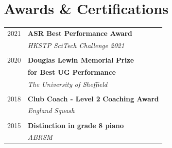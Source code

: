 \documentclass[10pt]{article} %
\begin{document}
\begin{changemargin}{0pt}{0.5pt}
\begin{minipage}[t]{0.44\textwidth}
\begin{changemargin}{1pt}{1pt}
\end{changemargin}


\section{Awards \& Certifications}

\begin{tabular}{rl}
	
	2021	& \textbf{ASR Best Performance Award}\\ & \textit{HKSTP SciTech Challenge 2021}\\ \\
	
	
	2020     & \textbf{Douglas Lewin Memorial Prize}\\ & \textbf{for Best UG Performance} \\& \textit{The University of Sheffield} \\ \\
	
	
	
	2018	 & \textbf{Club Coach - Level 2 Coaching Award}\\ & \textit{England Squash} \\ \\
	
	
	2015	 & \textbf{Distinction in grade 8 piano}\\ & \textit{ABRSM}
\end{tabular}\\%




\end{minipage}
\end{changemargin}
\end{document}
